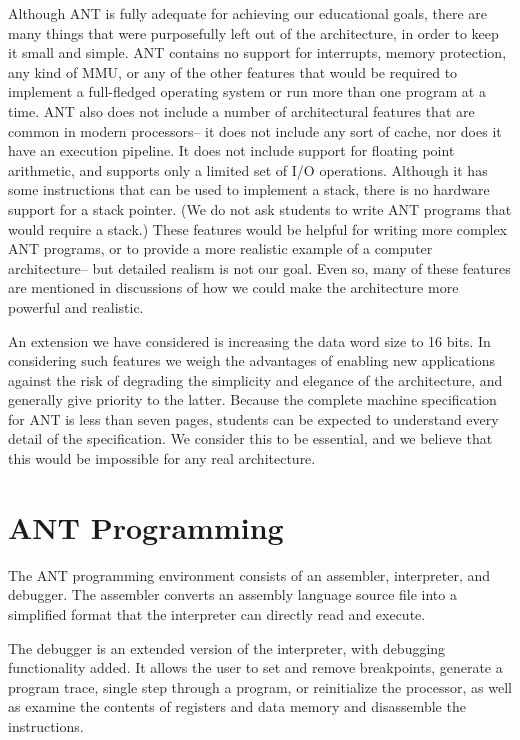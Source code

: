 Although ANT is fully adequate for achieving our educational goals,
there are many things that were purposefully left out of the architecture,
in order to keep it small and simple.  ANT
contains no support for interrupts, memory protection, any kind of
MMU, or any of the other features that would be required to implement a
full-fledged operating system or run more than one program at a time. 
ANT also does not include a number of architectural features that are
common in modern processors-- it does not include any sort of cache,
nor does it have an execution pipeline.  It does not include support
for floating point arithmetic, and supports only a limited set of I/O
operations. 
Although it has some instructions that can be used to implement a
stack, there is no hardware support for a stack pointer.
(We do not ask students to write ANT programs that would require
a stack.)
These features would be helpful
for writing more complex ANT programs, or to provide a more realistic
example of a computer architecture-- but detailed realism is not our goal.
Even so, many of these features are mentioned in discussions of how we
could make the architecture more powerful and realistic.

An extension we have considered is increasing the data word size to
16 bits.  In considering such features we weigh the advantages of
enabling new applications against the risk of degrading the simplicity
and elegance of the architecture, and generally give priority to the
latter.
Because the complete machine specification for ANT is less than seven
pages, students can be expected to understand every detail of the
specification.  We consider this to be essential, and we believe that
this would be impossible for any real architecture.

\section{ANT Programming}

The ANT programming environment consists of an assembler, interpreter,
and debugger.  The assembler converts an assembly language source file
into a simplified format that the interpreter can directly read and
execute.

The debugger is an extended version of the interpreter, with debugging
functionality added.  It allows the user to set and remove
breakpoints, generate a program trace, single step through a program,
or reinitialize the processor, as well as examine the contents of
registers and data memory and disassemble the instructions.

